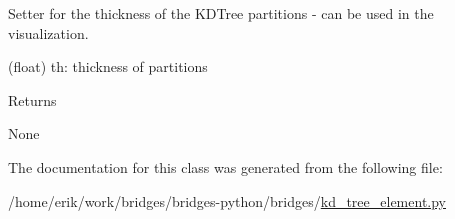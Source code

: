 Setter for the thickness of the K\+D\+Tree partitions -\/ can be used in the visualization. 

(float) th\+: thickness of partitions \begin{DoxyReturn}{Returns}


None 
\end{DoxyReturn}


The documentation for this class was generated from the following file\+:\begin{DoxyCompactItemize}
\item 
/home/erik/work/bridges/bridges-\/python/bridges/\hyperlink{kd__tree__element_8py}{kd\+\_\+tree\+\_\+element.\+py}\end{DoxyCompactItemize}
